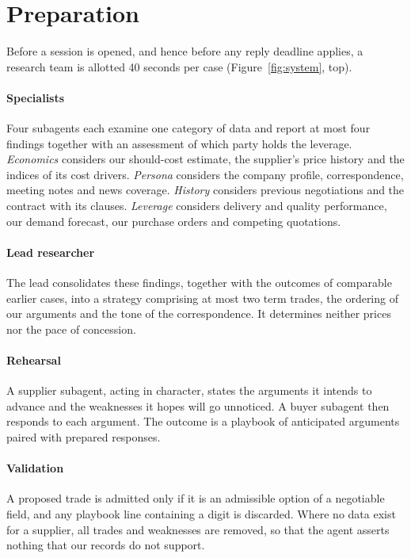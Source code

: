 \documentclass[10pt,a4paper,twocolumn]{article}
\begin{document}
\section{Preparation}

Before a session is opened, and hence before any reply deadline applies, a research team is
allotted 40 seconds per case (Figure~\ref{fig:system}, top).

\paragraph{Specialists} Four subagents each examine one category of data and report at most four
findings together with an assessment of which party holds the leverage. \emph{Economics}
considers our should-cost estimate, the supplier's price history and the indices of its cost
drivers. \emph{Persona} considers the company profile, correspondence, meeting notes and news
coverage. \emph{History} considers previous negotiations and the contract with its clauses.
\emph{Leverage} considers delivery and quality performance, our demand forecast, our purchase
orders and competing quotations.

\paragraph{Lead researcher} The lead consolidates these findings, together with the outcomes of
comparable earlier cases, into a strategy comprising at most two term trades, the ordering of our
arguments and the tone of the correspondence. It determines neither prices nor the pace of
concession.

\paragraph{Rehearsal} A supplier subagent, acting in character, states the arguments it intends
to advance and the weaknesses it hopes will go unnoticed. A buyer subagent then responds to each
argument. The outcome is a playbook of anticipated arguments paired with prepared responses.

\paragraph{Validation} A proposed trade is admitted only if it is an admissible option of a
negotiable field, and any playbook line containing a digit is discarded. Where no data exist for a
supplier, all trades and weaknesses are removed, so that the agent asserts nothing that our
records do not support.
\end{document}
